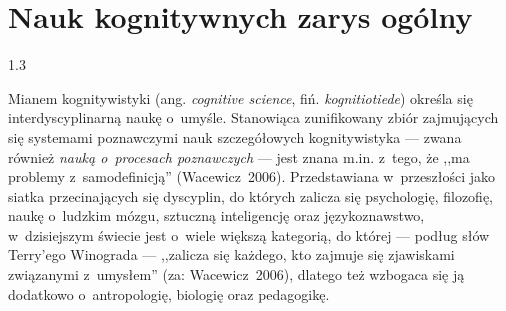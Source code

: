 \documentclass[11pt,a4paper,twoside]{report}
\begin{document}
\chapter{Nauk kognitywnych zarys ogólny}
\begin{spacing}{1.3}

Mianem kognitywistyki (ang. \textit{cognitive science}, fiń. \textit{kognitiotiede}) określa się interdyscyplinarną naukę o~umyśle. Stanowiąca zunifikowany zbiór zajmujących się systemami poznawczymi nauk szczegółowych kognitywistyka --- zwana również \textit{nauką o~procesach poznawczych} --- jest znana m.in. z~tego, że ,,ma problemy z~samodefinicją'' (Wacewicz~2006). Przedstawiana w~przeszłości jako siatka przecinających się dyscyplin, do których zalicza się psychologię, filozofię, naukę o~ludzkim mózgu, sztuczną inteligencję oraz językoznawstwo, w~dzisiejszym świecie jest o~wiele większą kategorią, do której --- podług słów Terry’ego Winograda --- ,,zalicza się każdego, kto zajmuje się zjawiskami związanymi z~umysłem'' (za: Wacewicz~2006), dlatego też wzbogaca się ją dodatkowo o~antropologię, biologię oraz pedagogikę.


\end{spacing}
\end{document}
